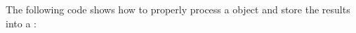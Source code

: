%	
%
%	
%
%	
%
%	
%
%	
%	
%	
%
%
\pnum
The following code shows how to properly process a  object  and store the results into a :

